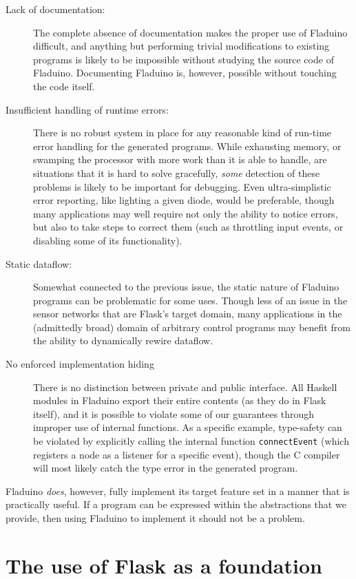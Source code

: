 \documentclass[a4paper, oneside, final]{memoir}
\begin{document}
\begin{description}
\item[Lack of documentation:] The complete absence of documentation
  makes the proper use of Fladuino difficult, and anything but
  performing trivial modifications to existing programs is likely to
  be impossible without studying the source code of Fladuino.
  Documenting Fladuino is, however, possible without touching the code
  itself.
\item[Insufficient handling of runtime errors:] There is no robust
  system in place for any reasonable kind of run-time error handling
  for the generated programs.  While exhausting memory, or swamping
  the processor with more work than it is able to handle, are
  situations that it is hard to solve gracefully, \textit{some}
  detection of these problems is likely to be important for debugging.
  Even ultra-simplistic error reporting, like lighting a given diode,
  would be preferable, though many applications may well require not
  only the ability to notice errors, but also to take steps to correct
  them (such as throttling input events, or disabling some of its
  functionality).
\item[Static dataflow:] Somewhat connected to the previous issue, the
  static nature of Fladuino programs can be problematic for some uses.
  Though less of an issue in the sensor networks that are Flask's
  target domain, many applications in the (admittedly broad) domain of
  arbitrary control programs may benefit from the ability to
  dynamically rewire dataflow.
\item[No enforced implementation hiding] There is no distinction
  between private and public interface.  All Haskell modules in
  Fladuino export their entire contents (as they do in Flask itself),
  and it is possible to violate some of our guarantees through
  improper use of internal functions.  As a specific example,
  type-safety can be violated by explicitly calling the internal
  function \texttt{connectEvent} (which registers a node as a listener
  for a specific event), though the C compiler will most likely catch
  the type error in the generated program.
\end{description}

\noindent
Fladuino \textit{does}, however, fully implement its target feature
set in a manner that is practically useful.  If a program can be
expressed within the abstractions that we provide, then using Fladuino
to implement it should not be a problem.

\section{The use of Flask as a foundation}
\end{document}
